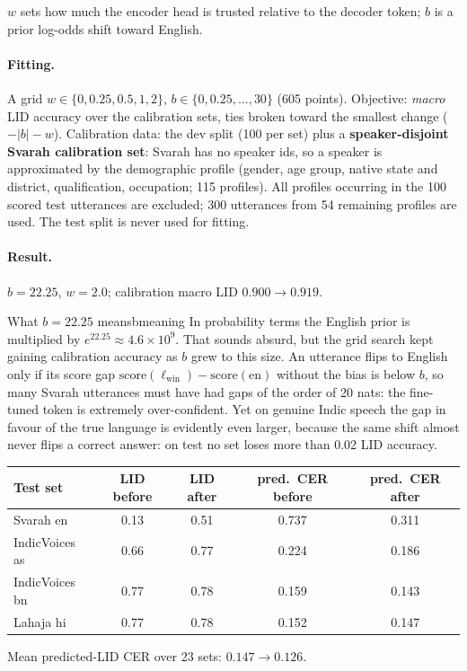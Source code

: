 $w$ sets how much the encoder head is trusted relative to the decoder token; $b$ is a prior log-odds shift toward English.

\paragraph{Fitting.} A grid $w\in\{0,0.25,0.5,1,2\}$, $b\in\{0,0.25,\dots,30\}$ (605 points). Objective: \emph{macro} LID accuracy over
the calibration sets, ties broken toward the smallest change ($-|b|-w$). Calibration data: the dev split (100 per set) plus a
\textbf{speaker-disjoint Svarah calibration set}: Svarah has no speaker ids, so a speaker is approximated by the demographic profile
(gender, age group, native state and district, qualification, occupation; 115 profiles). All profiles occurring in the 100 scored test
utterances are excluded; 300 utterances from 54 remaining profiles are used. The test split is never used for fitting.

\paragraph{Result.} $b=22.25$, $w=2.0$; calibration macro LID $0.900\to0.919$.

\begin{example}{What $b=22.25$ means}{bmeaning}
In probability terms the English prior is multiplied by $e^{22.25}\approx4.6\times10^{9}$. That sounds absurd, but the grid search
kept gaining calibration accuracy as $b$ grew to this size. An utterance flips to English only if its score gap
$\mathrm{score}(\ell_{\text{win}})-\mathrm{score}(\text{en})$ without the bias is below $b$, so many Svarah utterances must have had
gaps of the order of 20 nats: the fine-tuned token is extremely over-confident. Yet on genuine Indic speech the gap in favour of the
true language is evidently even larger, because the same shift almost never flips a correct answer: on test no set loses more than
0.02 LID accuracy.
\end{example}

\begin{center}
\begin{tabular}{lcccc}
\toprule
Test set & LID before & LID after & pred.\ CER before & pred.\ CER after\\
\midrule
Svarah en & 0.13 & 0.51 & 0.737 & 0.311\\
IndicVoices as & 0.66 & 0.77 & 0.224 & 0.186\\
IndicVoices bn & 0.77 & 0.78 & 0.159 & 0.143\\
Lahaja hi & 0.77 & 0.78 & 0.152 & 0.147\\
\bottomrule
\end{tabular}
\end{center}
Mean predicted-LID CER over 23 sets: $0.147\to0.126$.

